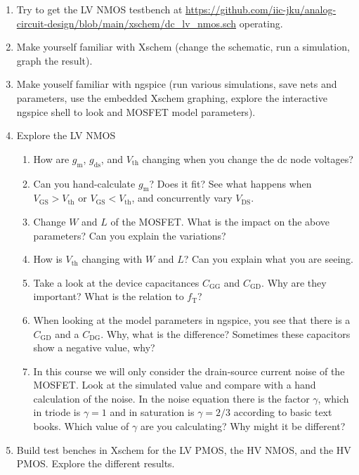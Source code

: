\documentclass[
  letterpaper,
  DIV=11,
  numbers=noendperiod]{scrartcl}
\providecommand{\tightlist}{%
  \setlength{\itemsep}{0pt}\setlength{\parskip}{0pt}}\usepackage{longtable,booktabs,array}
\begin{document}
\begin{enumerate}
\def\labelenumi{\arabic{enumi}.}
\tightlist
\item
  Try to get the LV NMOS testbench at
  \url{https://github.com/iic-jku/analog-circuit-design/blob/main/xschem/dc_lv_nmos.sch}
  operating.
\item
  Make yourself familiar with Xschem (change the schematic, run a
  simulation, graph the result).
\item
  Make youself familiar with ngspice (run various simulations, save nets
  and parameters, use the embedded Xschem graphing, explore the
  interactive ngspice shell to look and MOSFET model parameters).
\item
  Explore the LV NMOS

  \begin{enumerate}
  \def\labelenumii{\arabic{enumii}.}
  \tightlist
  \item
    How are \(g_\mathrm{m}\), \(g_\mathrm{ds}\), and \(V_\mathrm{th}\)
    changing when you change the dc node voltages?
  \item
    Can you hand-calculate \(g_\mathrm{m}\)? Does it fit? See what
    happens when \(V_\mathrm{GS} > V_\mathrm{th}\) or
    \(V_\mathrm{GS} < V_\mathrm{th}\), and concurrently vary
    \(V_\mathrm{DS}\).
  \item
    Change \(W\) and \(L\) of the MOSFET. What is the impact on the
    above parameters? Can you explain the variations?
  \item
    How is \(V_\mathrm{th}\) changing with \(W\) and \(L\)? Can you
    explain what you are seeing.
  \item
    Take a look at the device capacitances \(C_\mathrm{GG}\) and
    \(C_\mathrm{GD}\). Why are they important? What is the relation to
    \(f_\mathrm{T}\)?
  \item
    When looking at the model parameters in ngspice, you see that there
    is a \(C_\mathrm{GD}\) and a \(C_\mathrm{DG}\). Why, what is the
    difference? Sometimes these capacitors show a negative value, why?
  \item
    In this course we will only consider the drain-source current noise
    of the MOSFET. Look at the simulated value and compare with a hand
    calculation of the noise. In the noise equation there is the factor
    \(\gamma\), which in triode is \(\gamma=1\) and in saturation is
    \(\gamma=2/3\) according to basic text books. Which value of
    \(\gamma\) are you calculating? Why might it be different?
  \end{enumerate}
\item
  Build test benches in Xschem for the LV PMOS, the HV NMOS, and the HV
  PMOS. Explore the different results.


\end{enumerate}
\end{document}
